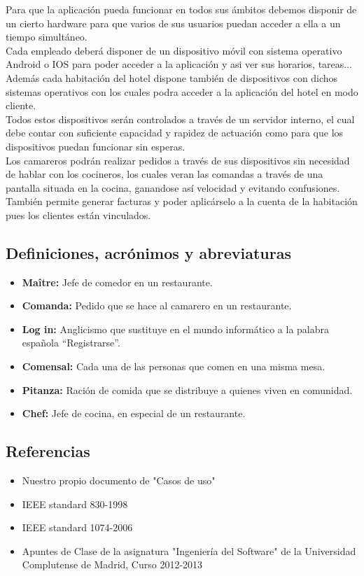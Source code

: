 \documentclass[spanish,a4paper,12pt]{report}		%
\begin{document}
\hspace {0.8 true cm} Para que la aplicación pueda funcionar en todos sus ámbitos debemos disponir de un cierto hardware para que varios de sus usuarios puedan acceder a ella a un tiempo simultáneo.\\

\hspace {0.15 true cm} Cada empleado deberá disponer de un dispositivo móvil con sistema operativo Android o IOS para poder acceder a la aplicación y asi ver sus horarios, tareas... Además cada habitación del hotel dispone también de dispositivos con dichos sistemas operativos con los cuales podra acceder a la aplicación del hotel en modo cliente. \\

\hspace {0.35 true cm}Todos estos dispositivos serán controlados a través de un servidor interno, el cual debe contar con suficiente capacidad y rapidez de actuación como para que los dispositivos puedan funcionar sin esperas.\\

\hspace {0.35 true cm}Los camareros podrán realizar pedidos a través de sus dispositivos sin necesidad de hablar con los cocineros, los cuales veran las comandas a través de una pantalla situada en la cocina, ganandose así velocidad y evitando confusiones. También permite generar facturas y poder aplicárselo a la cuenta de la habitación pues los clientes están vinculados.

\subsection{Definiciones, acrónimos y abreviaturas}
	\begin{itemize}
		\item \textbf{Maître:} Jefe de comedor en un restaurante. 
		\item \textbf{Comanda:} Pedido que se hace al camarero en un restaurante.
		\item \textbf{Log in:} Anglicismo que sustituye en el mundo informático a la palabra española “Registrarse”.
		\item \textbf{Comensal:} Cada una de las personas que comen en una misma mesa.
		\item \textbf{Pitanza:} Ración de comida que se distribuye a quienes viven en comunidad.
		\item \textbf{Chef:} Jefe de cocina, en especial de un restaurante.

	\end{itemize}

\subsection{Referencias}
	\begin{itemize}
		\item Nuestro propio documento de "Casos de uso"
		\item  IEEE standard 830-1998
		\item IEEE standard 1074-2006
		\item Apuntes de Clase de la asignatura "Ingeniería del Software" de la Universidad Complutense de Madrid, Curso 2012-2013

	\end{itemize}
\end{document}
